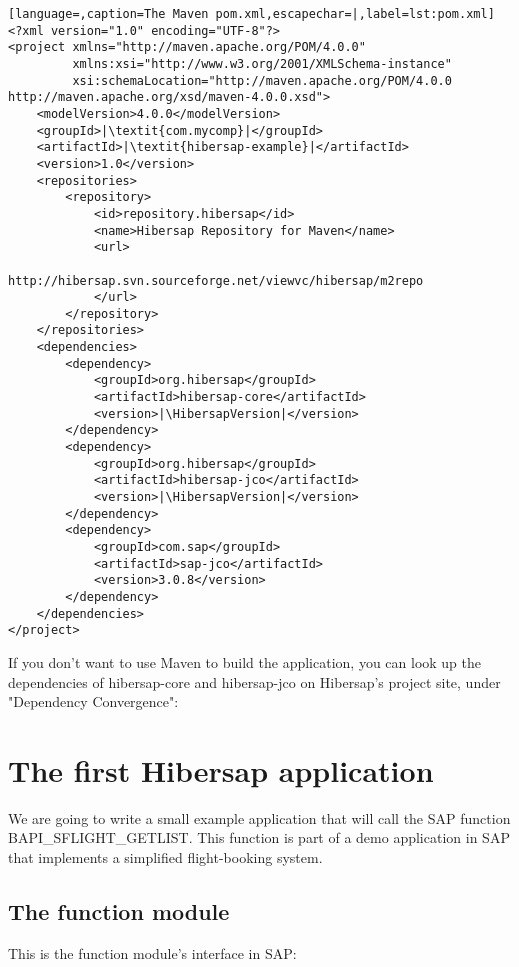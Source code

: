 \begin{lstlisting}[language=,caption=The Maven pom.xml,escapechar=|,label=lst:pom.xml]
<?xml version="1.0" encoding="UTF-8"?>
<project xmlns="http://maven.apache.org/POM/4.0.0"
         xmlns:xsi="http://www.w3.org/2001/XMLSchema-instance"
         xsi:schemaLocation="http://maven.apache.org/POM/4.0.0 http://maven.apache.org/xsd/maven-4.0.0.xsd">
    <modelVersion>4.0.0</modelVersion>
    <groupId>|\textit{com.mycomp}|</groupId>
    <artifactId>|\textit{hibersap-example}|</artifactId>
    <version>1.0</version>
    <repositories>
        <repository>
            <id>repository.hibersap</id>
            <name>Hibersap Repository for Maven</name>
            <url>
              http://hibersap.svn.sourceforge.net/viewvc/hibersap/m2repo
            </url>
        </repository>
    </repositories>                 
    <dependencies>
        <dependency>
            <groupId>org.hibersap</groupId>
            <artifactId>hibersap-core</artifactId>
            <version>|\HibersapVersion|</version>
        </dependency>
        <dependency>
            <groupId>org.hibersap</groupId>
            <artifactId>hibersap-jco</artifactId>
            <version>|\HibersapVersion|</version>
        </dependency>
        <dependency>
            <groupId>com.sap</groupId>
            <artifactId>sap-jco</artifactId>
            <version>3.0.8</version>
        </dependency>
    </dependencies>
</project>
\end{lstlisting}

If you don't want to use Maven to build the application, you can look up the dependencies of hibersap-core and hibersap-jco on Hibersap's project site, under "Dependency Convergence": \urlHibersapSite

\section{The first Hibersap application}

We are going to write a small example application that will call the SAP function \linebreak BAPI\_SFLIGHT\_GETLIST.
This function is part of a demo application in SAP that implements a simplified flight-booking system.

\subsection{The function module}

This is the function module's interface in SAP:

